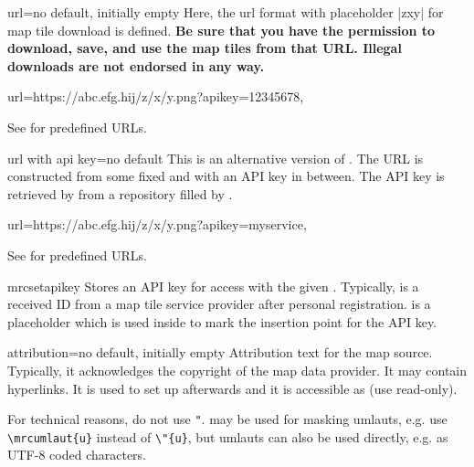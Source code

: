 \clearpage
\begin{docMrcKey}[supply]{url}{=}{no default, initially empty}
  Here, the url format with placeholder |{z}{x}{y}| for map tile download is defined.
  \textbf{Be sure that you have the permission to download, save, and use
  the map tiles from that URL. Illegal downloads are not endorsed in any
  way.}
  \begin{dispListing}
    url={https://abc.efg.hij/{z}/{x}/{y}.png?apikey=12345678},
  \end{dispListing}
  See  for predefined URLs.
\end{docMrcKey}


\begin{docMrcKey}[supply]{url with api key}{=}{no default}
  This is an alternative version of .
  The URL is constructed from some fixed  and  with
  an API key in between. The API key is retrieved by  from a
  repository filled by .
  \begin{dispListing}
    url={https://abc.efg.hij/{z}/{x}/{y}.png?apikey=}{myservice}{},
  \end{dispListing}
  See  for predefined URLs.
\end{docMrcKey}


\begin{docCommand}{mrcsetapikey}{}
  Stores an API key  for access with the given .
  Typically,  is a received ID from a map tile service provider
  after personal registration.  is a placeholder which is used
  inside  to mark the insertion
  point for the API key.
  \begin{dispListing}
  \end{dispListing}
\end{docCommand}



\begin{docMrcKey}[supply]{attribution}{=}{no default, initially empty}
  Attribution text for the map source. Typically, it acknowledges the copyright
  of the map data provider. It may contain hyperlinks.
  It is used to set up  afterwards
  and it is accessible as  (use read-only).\par
  For technical reasons, do not use \verb+"+. 
  may be used for masking umlauts, e.g. use \verb+\mrcumlaut{u}+ instead of
  \verb+\"{u}+, but umlauts can also be used directly, e.g. as UTF-8 coded characters.
\end{docMrcKey}


